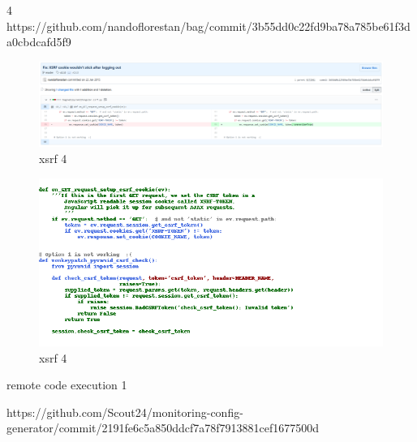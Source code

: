 \documentclass[
a4paper,
pagesize,
pdftex,
12pt,
twoside, %
BCOR=5mm, %
ngerman,
fleqn,
final,
]{scrartcl}
\begin{document}
4 https://github.com/nandoflorestan/bag/commit/3b55dd0c22fd9ba78a785be61f3da0cbdcafd5f9


\begin{figure}[h]
	\centering
	\includegraphics[width=\linewidth]{Images/xsrf4}
	\caption{xsrf 4}
	\label{fig:xsrf4}
\end{figure}
\begin{figure}[h]
	\centering
	\includegraphics[width=\linewidth]{Images/xsrf4r}
	\caption{xsrf 4}
	\label{fig:xsrf4r}
\end{figure}



remote code execution 1


https://github.com/Scout24/monitoring-config-generator/commit/2191fe6c5a850ddcf7a78f7913881cef1677500d
\end{document}
